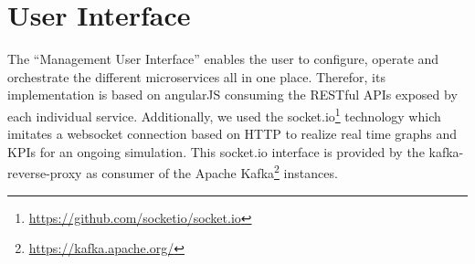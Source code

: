 \section{User Interface}
\label{sec:ui}
%
The ``Management User Interface'' enables the user to configure, operate and orchestrate the different microservices all in one place. Therefor, its implementation is based on angularJS consuming the RESTful APIs exposed by each individual service. Additionally, we used the socket.io\footnote{\url{https://github.com/socketio/socket.io}} technology which imitates a websocket connection based on HTTP to realize real time graphs and KPIs for an ongoing simulation. This socket.io interface is provided by the kafka-reverse-proxy as consumer of the Apache Kafka\footnote{\url{https://kafka.apache.org/}} instances.

